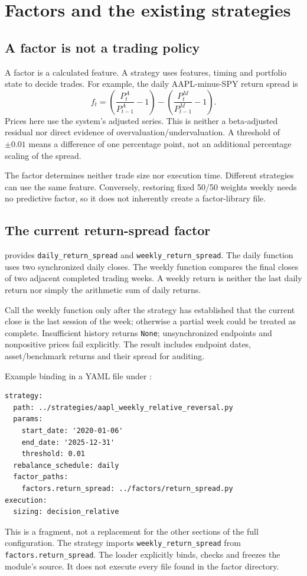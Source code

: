 \documentclass[11pt]{article}
\newcommand{\code}[1]{\nolinkurl{#1}}
\let\originalsection\section
\renewcommand{\section}{\Needspace{9\baselineskip}\originalsection}
\let\originalsubsection\subsection
\renewcommand{\subsection}{\Needspace{8\baselineskip}\originalsubsection}
\begin{document}
\section{Factors and the existing strategies}
\subsection{A factor is not a trading policy}
A factor is a calculated feature. A strategy uses features, timing and portfolio state to decide trades. For example, the daily AAPL-minus-SPY return spread is
\[
 f_t=\left(\frac{P^{A}_{t}}{P^{A}_{t-1}}-1\right)
     -\left(\frac{P^{M}_{t}}{P^{M}_{t-1}}-1\right).
\]
Prices here use the system's adjusted series. This is neither a beta-adjusted residual nor direct evidence of overvaluation/undervaluation. A threshold of \(\pm0.01\) means a difference of one percentage point, not an additional percentage scaling of the spread.

The factor determines neither trade size nor execution time. Different strategies can use the same feature. Conversely, restoring fixed 50/50 weights weekly needs no predictive factor, so it does not inherently create a factor-library file.

\subsection{The current return-spread factor}
 provides \code{daily_return_spread} and \code{weekly_return_spread}. The daily function uses two synchronized daily closes. The weekly function compares the final closes of two adjacent completed trading weeks. A weekly return is neither the last daily return nor simply the arithmetic sum of daily returns.

Call the weekly function only after the strategy has established that the current close is the last session of the week; otherwise a partial week could be treated as complete. Insufficient history returns \code{None}; unsynchronized endpoints and nonpositive prices fail explicitly. The result includes endpoint dates, asset/benchmark returns and their spread for auditing.

Example binding in a YAML file under :
\begin{lstlisting}
strategy:
  path: ../strategies/aapl_weekly_relative_reversal.py
  params:
    start_date: '2020-01-06'
    end_date: '2025-12-31'
    threshold: 0.01
  rebalance_schedule: daily
  factor_paths:
    factors.return_spread: ../factors/return_spread.py
execution:
  sizing: decision_relative
\end{lstlisting}
This is a fragment, not a replacement for the other sections of the full configuration. The strategy imports \code{weekly_return_spread} from \code{factors.return_spread}. The loader explicitly binds, checks and freezes the module's source. It does not execute every file found in the factor directory.
\end{document}
